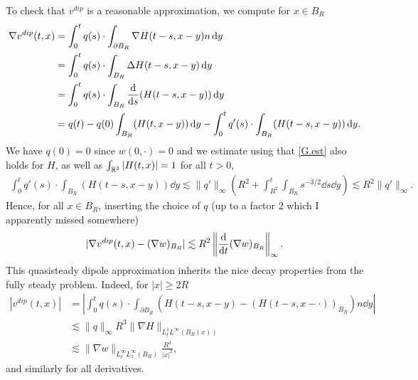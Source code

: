 \documentclass[abstracton, paper=a4, fontsize=11pt,DIV=12,bibliography=totoc]{scrartcl}
\begin{document}
To check that $v^{dip}$ is a reasonable approximation, we compute for $x \in B_R$
\begin{align*}
    \nabla v^{dip}(t,x) &= \int_0^t q(s) \cdot \int_{\partial B_R} \nabla H(t-s,  x-y)  n \, \mathrm{d} y \\
    &=   \int_0^t q(s) \cdot \int_{B_R} \Delta H(t-s,  x-y)   \, \mathrm{d} y \\
    &=  \int_0^t q(s) \cdot \int_{B_R} \frac{{\mathrm{d}}}{{\mathrm{d}} s} (H(t-s,  x-y))  \, \mathrm{d} y \\
    &=  q(t) - q(0) \int_{B_R}  (H(t,  x-y))  \, \mathrm{d} y - \int_0^t q'(s) \cdot \int_{B_R} (H(t-s,  x-y))  \, \mathrm{d} y.
\end{align*}
We have $q(0) = 0$ since $w(0,\cdot) = 0$ and we estimate using that \eqref{G.est} also holds for $H$, as well as $\int_{\mathbb{R}^3} |H(t,x)| = 1$ for all $t > 0$,  
\begin{align*}
    \int_0^t q'(s) \cdot \int_{B_R} (H(t-s,  x-y))  \dd y \lesssim \|q'\|_\infty ( R^2 +  \int_{R^2}^t \int_{B_R}  s^{-3/2} \dd s \dd y) \lesssim R^2 \|q'\|_\infty.
\end{align*}
Hence, for all $x \in B_R$, inserting the choice of $q$ (up to a factor $2$ which I apparently missed somewhere)
\begin{align*}
    | \nabla v^{dip}(t,x) - (\nabla w)_{B_R}| \lesssim R^2 \left\|\frac{{\mathrm{d}}}{{\mathrm{d}} t}(\nabla w)_{B_R}\right\|_\infty.
\end{align*}
This quasisteady dipole approximation inherits the nice decay properties from the fully steady problem. Indeed, for $|x| \geq 2R$
\begin{align*}
    |v^{dip}(t,x)| &= \left|\int_0^t q(s) \cdot \int_{\partial B_R} (H(t-s,  x-y) - (H(t-s,x-\cdot))_{B_R})   n \dd y\right|\\
    & \lesssim \|q\|_\infty R^3 \|\nabla H\|_{L^1_t L^\infty(B_R(x))} \\
    &\lesssim \|\nabla w\|_{L^\infty_t L^\infty_x(B_R)} \frac{R^3}{|x|^2},
\end{align*}
and similarly for all derivatives.
\end{document}
